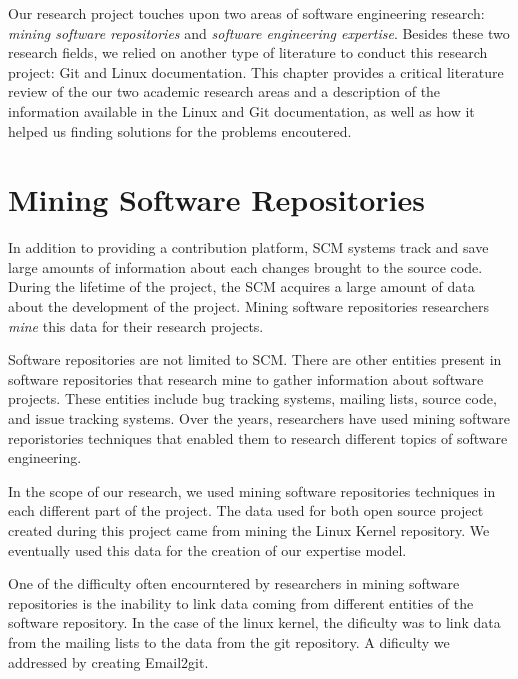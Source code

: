 \label{sec:RevLitt}


Our research project touches upon two areas of software engineering research: \textit{mining software repositories} and \textit{software engineering expertise}. Besides these two research fields, we relied on another type of literature to conduct this research project: Git and Linux documentation. This chapter provides a critical literature review of the our two academic research areas and a description of the information available in the Linux and Git documentation, as well as how it helped us finding solutions for the problems encoutered.



\section{Mining Software Repositories}

In addition to providing a contribution platform, \ac{SCM} systems track and save large amounts of information about each changes brought to the source code. During the lifetime of the project, the \ac{SCM} acquires a large amount of data about the development of the project. Mining software repositories researchers \textit{mine} this data for their research projects. 

Software repositories are not limited to \ac{SCM}. There are other entities present in software repositories that research mine to gather information about software projects. These entities include bug tracking systems, mailing lists, source code, and issue tracking systems. Over the years, researchers have used mining software reporistories techniques that enabled them to research different topics of software engineering. 

In the scope of our research, we used mining software repositories techniques in each different part of the project. The data used for both open source project created during this project came from mining the Linux Kernel repository. We eventually used this data for the creation of our expertise model.

One of the difficulty often encourntered by researchers in mining software repositories is the inability to link data coming from different entities of the software repository. In the case of the linux kernel, the dificulty was to link data from the mailing lists to the data from the git repository. A dificulty we addressed by creating Email2git.



